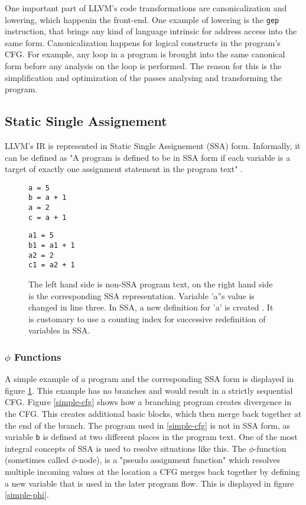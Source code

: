One important part of LLVM's code transformations are canonicalization and lowering, which happenin the front-end. One example of lowering is the \verb|gep| instruction, that brings any kind of language intrinsic for address access into the same form. Canonicalization happens for logical constructs in the program's CFG. For example, any loop in a program is brought into the same canonical form before any analysis on the loop is performed.
The reason for this is the simplification and optimization of the passes analysing and transforming the program. 
\cite{llvm-passes}
\subsection{Static Single Assignement}
LLVM's IR is represented in Static Single Assignement (SSA) form. Informally, it can be defined as
"A program is defined to be in SSA form if each variable is a target of exactly one assignment
statement in the program text" \cite[p. 6]{Rastello:2016:SCD:3002539}.
\begin{figure}[t]
	\begin{minipage}{0.43\textwidth}	
\begin{lstlisting}[style=c]
a = 5
b = a + 1
a = 2
c = a + 1
\end{lstlisting}
	\end{minipage}\hfill
	\begin{minipage}{0.5\textwidth}
\begin{lstlisting}[style=c]
a1 = 5
b1 = a1 + 1
a2 = 2
c1 = a2 + 1
\end{lstlisting}
	\end{minipage}\hfill
	\caption[non-SSA vs. SSA code]{The left hand side is non-SSA program text, on the right hand side is the corresponding SSA representation.  Variable 'a''s value is changed in line three. In SSA, a new definition for 'a' is created . It is customary to use a counting index for successive redefinition of variables in SSA.}
	\label{simpleSSA}
\end{figure}
\subsubsection{$\phi$ Functions}
A simple example of a program and the corresponding SSA form is displayed in figure \ref{simpleSSA}.
This example has no branches and would result in a strictly sequential CFG.
Figure \ref{simple-cfg} shows how a branching program creates divergence in the CFG. This creates additional basic blocks,
which then merge back together at the end of the branch. The program used in \ref{simple-cfg} is not in SSA form, as variable \verb|b| is defined at two different places in the program text. One of the most integral concepts of SSA is used to resolve situations like this.
The $\phi$-function (sometimes called $\phi$-node), is a "pseudo assignment function"\cite{Rastello:2016:SCD:3002539} which resolves multiple incoming values
at the location a CFG merges back together by defining a new variable that is used in the later program flow. This is displayed in figure \ref{simple-phi}.
\cite{Rastello:2016:SCD:3002539}

